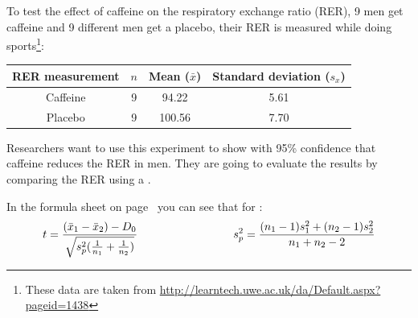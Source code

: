 

To test the effect of caffeine on the respiratory exchange ratio (RER), 9 men get caffeine and 9 different men get a placebo, their RER is measured while doing sports\footnote{These data are taken from \url{http://learntech.uwe.ac.uk/da/Default.aspx?pageid=1438}}: \\
\vspace*{0.5cm}
\begin{center}
\begin{tabular}{c|ccc}
RER measurement & $n$ & Mean ($\bar{x}$) & Standard deviation ($s_x$) \tstrut\bstrut\\
\hline
Caffeine & 9 & 94.22 & 5.61 \tstrut\bstrut\\
Placebo & 9 & 100.56 & 7.70 \tstrut\bstrut\\
\end{tabular}
\end{center}
\vspace*{0.5cm}

Researchers want to use this experiment to show with 95\% confidence that caffeine reduces the RER in men. They are going to evaluate the results by comparing the  RER using a . \\





In the formula sheet on page~\pageref{formulasheet} you can see that for :
\vspace*{0.5cm}
\begin{equation*}
    t = \frac{(\bar{x}_1 - \bar{x}_2) - D_0}{\sqrt{s^2_p (\frac{1}{n_1} + \frac{1}{n_2})}}
    \hspace*{3cm}
    s^2_p = \frac{(n_1 - 1) s^2_1 + (n_2 - 1) s^2_2}{n_1 + n_2 - 2}
\end{equation*}
\vspace*{0.5cm}

